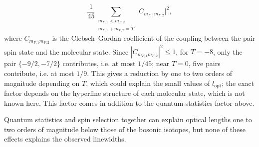 \begin{itemize}
    \begin{equation}
        \frac{1}{45}\sum_{\substack{m_{F,1}<m_{F,2}\\ m_{F,1}+m_{F,2}=T}} \big|C_{m_{F,1}m_{F,2}}\big|^2,
    \end{equation}
    where $C_{m_{F,1}m_{F,2}}$ is the Clebsch--Gordan coefficient of the coupling between the pair spin state and the molecular state. Since $|C_{m_{F,1}m_{F,2}}|^2\leq1$, for $T=-8$, only the pair $\{-9/2,-7/2\}$ contributes, i.e. at most $1/45$; near $T=0$, five pairs contribute, i.e. at most $1/9$. This gives a reduction by one to two orders of magnitude depending on $T$, which could explain the small values of $l_{\text{opt}}$; the exact factor depends on the hyperfine structure of each molecular state, which is not known here. This factor comes in addition to the quantum-statistics factor above.
\end{itemize}
Quantum statistics and spin selection together can explain optical lengths one to two orders of magnitude below those of the bosonic isotopes, but none of these effects explains the observed linewidths.

